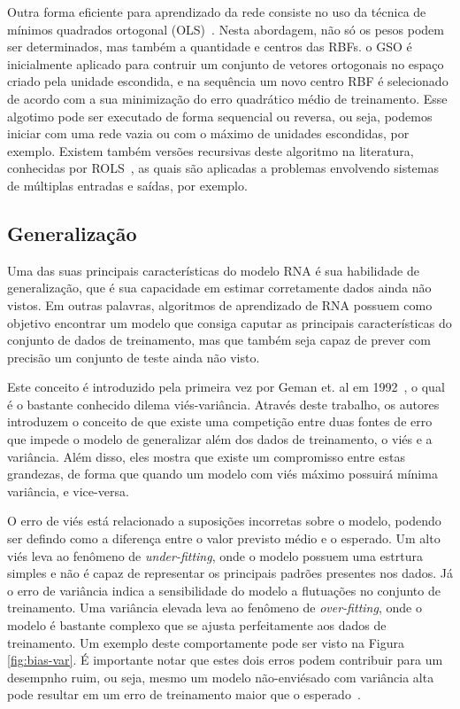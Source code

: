\documentclass[conference]{IEEEtran}
\begin{document}
	Outra forma eficiente para aprendizado da rede consiste no uso da técnica de mínimos quadrados ortogonal (OLS)~\cite{chen1991orthogonal, chen1992orthogonal, chen1995fast, hong1997givens}. Nesta abordagem, não só os pesos podem ser determinados, mas também a quantidade e centros das RBFs. o GSO é inicialmente aplicado para contruir um conjunto de vetores ortogonais no espaço criado pela unidade escondida, e na sequência um novo centro RBF é selecionado de acordo com a sua minimização do erro quadrático médio de treinamento. Esse algotimo pode ser executado de forma sequencial ou reversa, ou seja, podemos iniciar com uma rede vazia ou com o máximo de unidades escondidas, por exemplo. Existem também versões recursivas deste algoritmo na literatura, conhecidas por ROLS~\cite{yu1997recursive}, as quais são aplicadas a problemas envolvendo sistemas de múltiplas entradas e saídas, por exemplo.
	

	\subsection{Generalização} \label{sec:generalization}
    Uma das suas principais características do modelo RNA é sua habilidade de generalização, que é sua capacidade em estimar corretamente dados ainda não vistos. Em outras palavras, algoritmos de aprendizado de RNA possuem como objetivo encontrar um modelo que consiga caputar as principais características do conjunto de dados de treinamento, mas que também seja capaz de prever com precisão um conjunto de teste ainda não visto.
        
    Este conceito é introduzido pela primeira vez por Geman et. al em 1992~\cite{geman1992neural}, o qual é o bastante conhecido dilema viés-variância. Através deste trabalho, os autores introduzem o conceito de que existe uma competição entre duas fontes de erro que impede o modelo de generalizar além dos dados de treinamento, o viés e a variância. Além disso, eles mostra que existe um compromisso entre estas grandezas, de forma que quando um modelo com viés máximo possuirá mínima variância, e vice-versa.
    
    O erro de viés está relacionado a suposições incorretas sobre o modelo, podendo ser defindo como a diferença entre o valor previsto médio e o esperado. Um alto viés leva ao fenômeno de \textit{under-fitting}, onde o modelo possuem uma estrtura simples e não é capaz de representar os principais padrões presentes nos dados. Já o erro de variância indica a sensibilidade do modelo a flutuações no conjunto de treinamento. Uma variância elevada leva ao fenômeno de \textit{over-fitting}, onde o modelo é bastante complexo que se ajusta perfeitamente aos dados de treinamento. Um exemplo deste comportamente pode ser visto na Figura \ref{fig:bias-var}. É importante notar que estes dois erros podem contribuir para um desempnho ruim, ou seja, mesmo um modelo não-enviésado com variância alta pode resultar em um erro de treinamento maior que o esperado~\cite{geman1992neural}.
    
\end{document}
